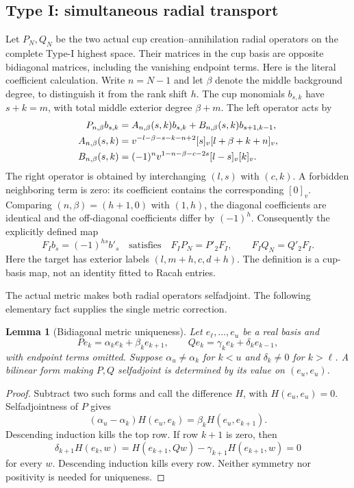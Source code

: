 \documentclass[10pt,a4paper]{article}
\newtheorem{lemma}[theorem]{Lemma}
\newenvironment{revision}{\begingroup}{\endgroup}
\begin{document}
\begin{revision}
\subsection{Type I: simultaneous radial transport}
Let $P_N,Q_N$ be the two actual cup creation--annihilation radial operators
on the complete Type-I highest space. Their matrices in the cup basis
are opposite bidiagonal matrices, including the vanishing endpoint terms.
Here is the literal coefficient calculation. Write $n=N-1$ and let
$\beta$ denote the middle background degree, to distinguish it from the
rank shift $h$. The cup monomials $b_{s,k}$ have $s+k=m$, with total
middle exterior degree $\beta+m$. The left operator acts by
\begin{align}
 P_{n,\beta}b_{s,k}
   &=A_{n,\beta}(s,k)b_{s,k}
       +B_{n,\beta}(s,k)b_{s+1,k-1},\notag\\
 A_{n,\beta}(s,k)
   &=v^{-l-\beta-s-k-n+2}[s]_v[l+\beta+k+n]_v,\notag\\
 B_{n,\beta}(s,k)
   &=(-1)^n v^{1-n-\beta-c-2s}[l-s]_v[k]_v.
 \label{eq:certIcoefficients}
\end{align}
The right operator is obtained by interchanging $(l,s)$ with $(c,k)$.
A forbidden neighboring term is zero: its coefficient contains the
corresponding $[0]_v$. Comparing $(n,\beta)=(h+1,0)$ with $(1,h)$,
the diagonal coefficients are identical and the off-diagonal coefficients
differ by $(-1)^h$. Consequently the explicitly defined map
\begin{equation}\label{eq:certIraw}
 F_Ib_s=(-1)^{hs}b'_s
 \quad\text{satisfies}\quad F_IP_N=P'_2F_I,\qquad F_IQ_N=Q'_2F_I.
\end{equation}
Here the target has exterior labels $(l,m+h,c,d+h)$.
The definition is a cup-basis map, not an identity fitted to Racah entries.

The actual metric makes both radial operators selfadjoint. The following
elementary fact supplies the single metric correction.
\begin{lemma}[Bidiagonal metric uniqueness]\label{lem:gram}
Let $e_\ell,\ldots,e_u$ be a real basis and
\[
 Pe_k=\alpha_ke_k+\beta_ke_{k+1},\qquad
 Qe_k=\gamma_ke_k+\delta_ke_{k-1},
\]
with endpoint terms omitted. Suppose $\alpha_u\ne\alpha_k$ for $k<u$
and $\delta_k\ne0$ for $k>\ell$. A bilinear form making $P,Q$
selfadjoint is determined by its value on $(e_u,e_u)$.
\end{lemma}
\begin{proof}
Subtract two such forms and call the difference $H$, with
$H(e_u,e_u)=0$. Selfadjointness of $P$ gives
\[
 (\alpha_u-\alpha_k)H(e_u,e_k)=\beta_kH(e_u,e_{k+1}).
\]
Descending induction kills the top row. If row $k+1$ is zero, then
\[
 \delta_{k+1}H(e_k,w)
 =H(e_{k+1},Qw)-\gamma_{k+1}H(e_{k+1},w)=0
\]
for every $w$. Descending induction kills every row. Neither symmetry
nor positivity is needed for uniqueness.
\end{proof}


\end{revision}
\end{document}
